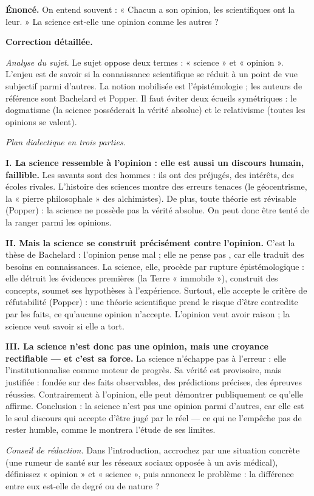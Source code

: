 \documentclass[11pt]{article}
\begin{document}
\begin{exoresolu}
\textbf{Énoncé.} On entend souvent : « Chacun a son opinion, les scientifiques ont la leur. » La science est-elle une opinion comme les autres ?

\tcblower
\textbf{Correction détaillée.}

\emph{Analyse du sujet.} Le sujet oppose deux termes : « science » et « opinion ». L'enjeu est de savoir si la connaissance scientifique se réduit à un point de vue subjectif parmi d'autres. La notion mobilisée est l'épistémologie ; les auteurs de référence sont Bachelard et Popper. Il faut éviter deux écueils symétriques : le dogmatisme (la science posséderait la vérité absolue) et le relativisme (toutes les opinions se valent).

\emph{Plan dialectique en trois parties.}

\textbf{I. La science ressemble à l'opinion : elle est aussi un discours humain, faillible.}
Les savants sont des hommes : ils ont des préjugés, des intérêts, des écoles rivales. L'histoire des sciences montre des erreurs tenaces (le géocentrisme, la « pierre philosophale » des alchimistes). De plus, toute théorie est révisable (Popper) : la science ne possède pas la vérité absolue. On peut donc être tenté de la ranger parmi les opinions.

\textbf{II. Mais la science se construit précisément contre l'opinion.}
C'est la thèse de Bachelard : \guillemotleft l'opinion pense mal ; elle ne pense pas \guillemotright, car elle traduit des besoins en connaissances. La science, elle, procède par rupture épistémologique : elle détruit les évidences premières (la Terre « immobile »), construit des concepts, soumet ses hypothèses à l'expérience. Surtout, elle accepte le critère de réfutabilité (Popper) : une théorie scientifique prend le risque d'être contredite par les faits, ce qu'aucune opinion n'accepte. L'opinion veut avoir raison ; la science veut savoir si elle a tort.

\textbf{III. La science n'est donc pas une opinion, mais une croyance rectifiable --- et c'est sa force.}
La science n'échappe pas à l'erreur : elle l'institutionnalise comme moteur de progrès. Sa vérité est provisoire, mais justifiée : fondée sur des faits observables, des prédictions précises, des épreuves réussies. Contrairement à l'opinion, elle peut démontrer publiquement ce qu'elle affirme. Conclusion : la science n'est pas une opinion parmi d'autres, car elle est le seul discours qui accepte d'être jugé par le réel --- ce qui ne l'empêche pas de rester humble, comme le montrera l'étude de ses limites.

\emph{Conseil de rédaction.} Dans l'introduction, accrochez par une situation concrète (une rumeur de santé sur les réseaux sociaux opposée à un avis médical), définissez « opinion » et « science », puis annoncez le problème : la différence entre eux est-elle de degré ou de nature ?
\end{exoresolu}
\end{document}
